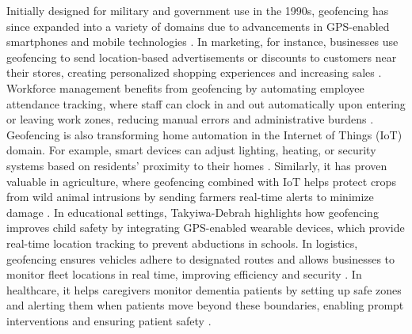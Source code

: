 Initially designed for military and government use in the 1990s, geofencing has since expanded into a variety of domains due to advancements in GPS-enabled smartphones and mobile technologies \cite{westbrook2019gps}. In marketing, for instance, businesses use geofencing to send location-based advertisements or discounts to customers near their stores, creating personalized shopping experiences and increasing sales \cite{greenwald2011geofencing}. Workforce management benefits from geofencing by automating employee attendance tracking, where staff can clock in and out automatically upon entering or leaving work zones, reducing manual errors and administrative burdens \cite{amudha2019smarthome}.
Geofencing is also transforming home automation in the Internet of Things (IoT) domain. For example, smart devices can adjust lighting, heating, or security systems based on residents' proximity to their homes \cite{amudha2019smarthome}. Similarly, it has proven valuable in agriculture, where geofencing combined with IoT helps protect crops from wild animal intrusions by sending farmers real-time alerts to minimize damage \cite{kadam2020crops}. In educational settings, Takyiwa-Debrah \cite{takyiwa2023geofence} highlights how geofencing improves child safety by integrating GPS-enabled wearable devices, which provide real-time location tracking to prevent abductions in schools.
In logistics, geofencing ensures vehicles adhere to designated routes and allows businesses to monitor fleet locations in real time, improving efficiency and security \cite{reclus2009fleet}. In healthcare, it helps caregivers monitor dementia patients by setting up safe zones and alerting them when patients move beyond these boundaries, enabling prompt interventions and ensuring patient safety \cite{arora2023location}.


